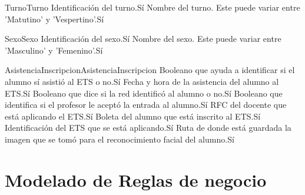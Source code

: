 \begin{cdtEntidad}{Turno}{Turno}
	{Identificación del turno.}{Sí}
	{Nombre del turno. Este puede variar entre 'Matutino' y 'Vespertino'.}{Sí}
\end{cdtEntidad}
\begin{cdtEntidad}{Sexo}{Sexo}
	{Identificación del sexo.}{Sí}
	{Nombre del sexo. Este puede variar entre 'Masculino' y 'Femenino'.}{Sí}
\end{cdtEntidad}
\begin{cdtEntidad}{AsistenciaInscripcion}{AsistenciaInscripcion}
	{Booleano que ayuda a identificar si el alumno sí asistió al ETS o no.}{Sí}
	{Fecha y hora de la asistencia del alumno al ETS.}{Sí}
	{Booleano que dice si la red identificó al alumno o no.}{Sí}
	{Booleano que identifica si el profesor le aceptó la entrada al alumno.}{Sí}
	{RFC del docente que está aplicando el ETS.}{Sí}
	{Boleta del alumno que está inscrito al ETS.}{Sí}
	{Identificación del ETS que se está aplicando.}{Sí}
	{Ruta de donde está guardada la imagen que se tomó para el reconocimiento facial del alumno.}{Sí}
\end{cdtEntidad}
\section{Modelado de Reglas de negocio}



